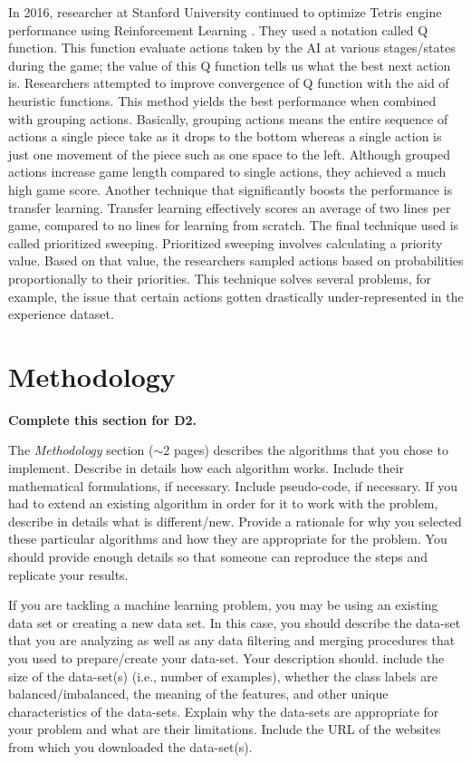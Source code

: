 \documentclass[letterpaper]{article} %
\begin{document}
In 2016, researcher at Stanford University continued to optimize Tetris engine performance using Reinforcement Learning \cite{s016}. They used a notation called Q function. This function evaluate actions taken by the AI at various stages/states during the game; the value of this Q function tells us what the best next action is. Researchers attempted to improve convergence of Q function with the aid of heuristic functions. This method yields the best performance when combined with grouping actions. Basically, grouping actions means the entire sequence of actions a single piece take as it drops to the bottom whereas a single action is just one movement of the piece such as one space to the left. Although grouped actions increase game length compared to single actions, they achieved a much high game score. Another technique that significantly boosts the performance is transfer learning. Transfer learning effectively scores an average of two lines per game, compared to no lines for learning from scratch. The final technique used is called prioritized sweeping. Prioritized sweeping involves calculating a priority value. Based on that value, the researchers sampled actions based on probabilities proportionally to their priorities. This technique solves several problems, for example, the issue that certain actions gotten drastically under-represented in the experience dataset.


\section{Methodology}

{\bf Complete this section for D2.}

The {\it Methodology } section ($\sim$2 pages) describes the algorithms that you chose to implement.  Describe in details how each algorithm works.  Include their mathematical formulations, if necessary.  Include pseudo-code, if necessary.  If you had to extend an existing algorithm in order for it to work with the problem, describe in details what is different/new.  Provide a rationale for why you selected these particular algorithms and how they are appropriate for the problem.  You should provide enough details so that someone can reproduce the steps and replicate your results.  

If you are tackling a machine learning problem, you may be using an existing data set or creating a new data set.  In this case, you should describe the data-set that you are analyzing as well as any data filtering and merging procedures that you used to prepare/create your data-set.  Your description should. include the size of the data-set(s) (i.e., number of examples), whether the class labels are balanced/imbalanced, the meaning of the features, and other unique characteristics of the data-sets.   Explain why the data-sets are appropriate for your problem and what are their limitations.  Include the URL of the websites from which you downloaded the data-set(s).
\end{document}
